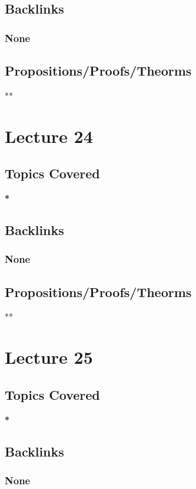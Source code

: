 \documentclass[11pt]{article}
\begin{document}
\subsection*{Backlinks}
\label{sec:org912cace}
\subsubsection*{None}
\label{sec:orgafa5d35}
\subsection*{Propositions/Proofs/Theorms}
\label{sec:org9e5f980}
**

\section*{Lecture 24}
\label{sec:orgaf5a6bc}
\subsection*{Topics Covered}
\label{sec:org428fd26}
\textbf{*}
\subsection*{Backlinks}
\label{sec:orgb0c2354}
\subsubsection*{None}
\label{sec:orgc70c821}
\subsection*{Propositions/Proofs/Theorms}
\label{sec:org81bc9a7}
**

\section*{Lecture 25}
\label{sec:orgecefadb}
\subsection*{Topics Covered}
\label{sec:orgcec6f19}
\textbf{*}
\subsection*{Backlinks}
\label{sec:orgaff5841}
\subsubsection*{None}
\label{sec:org085b8c5}
\end{document}
